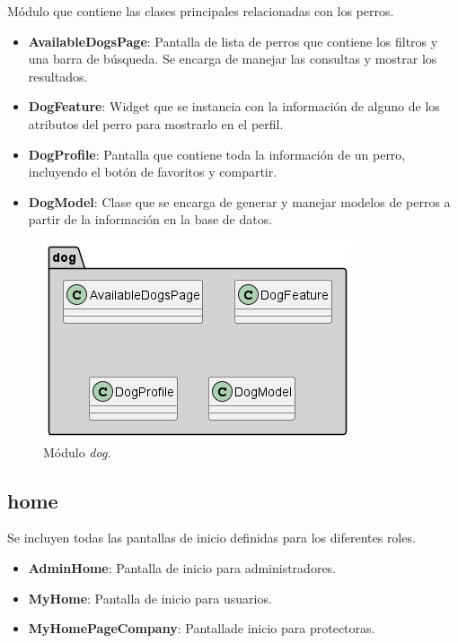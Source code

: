 \documentclass[a4paper, 12pt]{article}
\begin{document}
Módulo que contiene las clases principales relacionadas con los perros.

\begin{itemize}[noitemsep]
	\item \textbf{AvailableDogsPage}: Pantalla de lista de perros que contiene los filtros y una barra de búsqueda. Se encarga de manejar las consultas y mostrar los resultados.
	\item \textbf{DogFeature}: Widget que se instancia con la información de alguno de los atributos del perro para mostrarlo en el perfil.
	\item \textbf{DogProfile}: Pantalla que contiene toda la información de un perro, incluyendo el botón de favoritos y compartir.
	\item \textbf{DogModel}: Clase que se encarga de generar y manejar modelos de perros a partir de la información en la base de datos. 
\end{itemize}

\begin{figure}[H]
	\begin{center}
		{\includegraphics[width=0.8\linewidth]{diagram/Dog.png}\par}
		\caption{Módulo  \textit{dog}.}
	\end{center}
\end{figure}


\subsection*{home}

Se incluyen todas las pantallas de inicio definidas para los diferentes roles.

\begin{itemize}[noitemsep]
	\item \textbf{AdminHome}: Pantalla de inicio para administradores.
	\item \textbf{MyHome}: Pantalla de inicio para usuarios.
	\item \textbf{MyHomePageCompany}: Pantallade inicio para protectoras.
\end{itemize}
\end{document}
